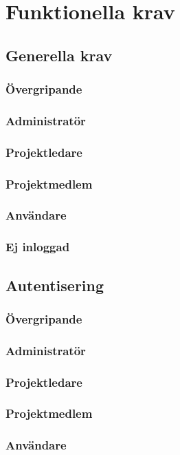 \documentclass[a4paper]{article}
\begin{document}
\section{Funktionella krav}
	\subsection{Generella krav}
		\label{krav-funk-gen}
		\subsubsection*{Övergripande}
		\subsubsection*{Administratör}
		\subsubsection*{Projektledare}
		\subsubsection*{Projektmedlem}
		\subsubsection*{Användare}
		\subsubsection*{Ej inloggad}


	\subsection{Autentisering}
		\label{krav-funk-aut}
		\subsubsection*{Övergripande}
		\subsubsection*{Administratör}
		\subsubsection*{Projektledare}
		\subsubsection*{Projektmedlem}
		\subsubsection*{Användare}
\end{document}
